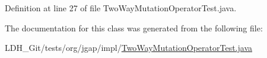 Definition at line 27 of file Two\-Way\-Mutation\-Operator\-Test.\-java.



The documentation for this class was generated from the following file\-:\begin{DoxyCompactItemize}
\item 
L\-D\-H\-\_\-\-Git/tests/org/jgap/impl/\hyperlink{_two_way_mutation_operator_test_8java}{Two\-Way\-Mutation\-Operator\-Test.\-java}\end{DoxyCompactItemize}
